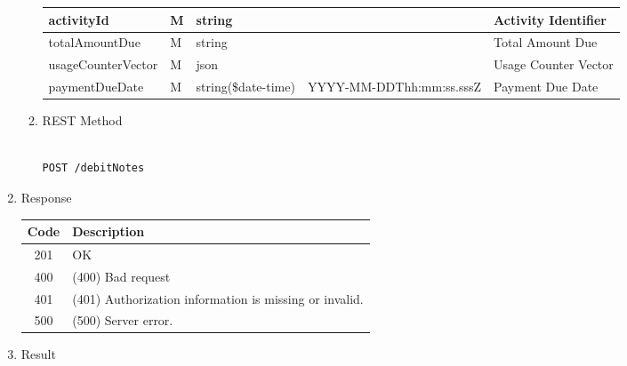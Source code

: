 \begin{enumerate}
\begin{enumerate}
\begin{table}[H]
\begin{center}
\begin{tabular}{|p{3cm}|l|p{3cm}|p{3cm}|p{4cm}|}
activityId				& M	& 	string				&								&	Activity Identifier \\ 
\hline

totalAmountDue			& M	& 	string				&								&	Total Amount Due \\ 
\hline

usageCounterVector		& M & 	json				&								&	Usage Counter Vector \\
\hline

paymentDueDate			& M &	string(\$date-time)	&	YYYY-MM-DDThh:mm:ss.sssZ	&	Payment Due Date \\
\hline

\end{tabular}
\end{center}
\end{table}


\item REST Method

\begin{tcolorbox}[boxrule=0pt, frame empty]
\begin{verbatim} 

POST /debitNotes

\end{verbatim}
\end{tcolorbox}

\end{enumerate}

\item Response

\begin{table}[H]
\footnotesize

\begin{center}
\begin{tabular}{|c|l|} 
\hline
\rowcolor{lightgray}	Code 		& 	Description \\
\hline
201	 		&	OK \\
\hline
400			&	(400) Bad request \\
\hline
401			&	(401) Authorization information is missing or invalid. \\
\hline
500			&	(500) Server error. \\
\hline
\end{tabular}
\end{center}
\end{table}

\item Result

\begin{tcolorbox}[boxrule=0pt, frame empty]
\begin{verbatim}


\end{verbatim}
\end{tcolorbox}
\end{enumerate}
